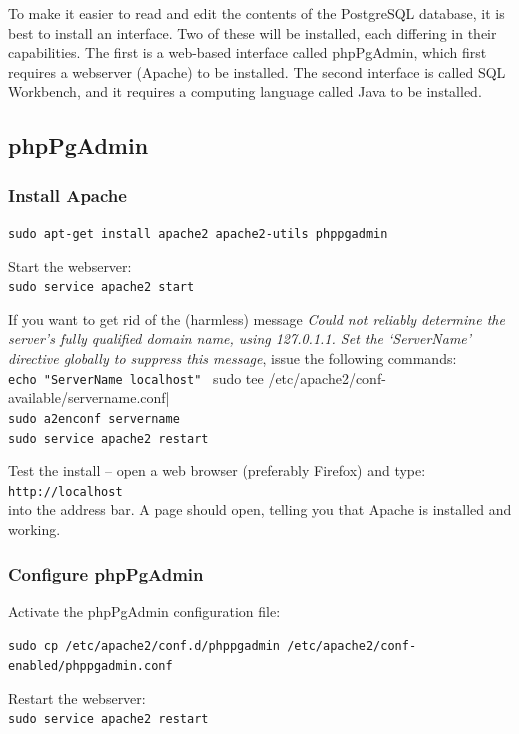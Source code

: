 To make it easier to read and edit the contents of the PostgreSQL database, it is best to install an interface.  Two of these will be installed, each differing in their capabilities.  The first is a web-based interface called phpPgAdmin, which first requires a webserver (Apache) to be installed.  The second interface is called SQL Workbench, and it requires a computing language called Java to be installed.

\subsection{phpPgAdmin}

\subsubsection{Install Apache}
\label{ss:apache}

\verb|sudo apt-get install apache2 apache2-utils phppgadmin|

Start the webserver:\\
\verb|sudo service apache2 start|

If you want to get rid of the (harmless) message \textit{Could not reliably determine the server's fully qualified domain name, using 127.0.1.1. Set the `ServerName' directive globally to suppress this message}, issue the following commands:\\
\verb|echo "ServerName localhost" | sudo tee /etc/apache2/conf-available/servername.conf|\\
\verb|sudo a2enconf servername|\\
\verb|sudo service apache2 restart|

Test the install -- open a web browser (preferably Firefox) and type:\\
\verb|http://localhost|\\
into the address bar. A page should open, telling you that Apache is installed and working.

\subsubsection{Configure phpPgAdmin}

Activate the phpPgAdmin configuration file:

\verb|sudo cp /etc/apache2/conf.d/phppgadmin /etc/apache2/conf-enabled/phppgadmin.conf|

Restart the webserver:\\
\verb|sudo service apache2 restart|


